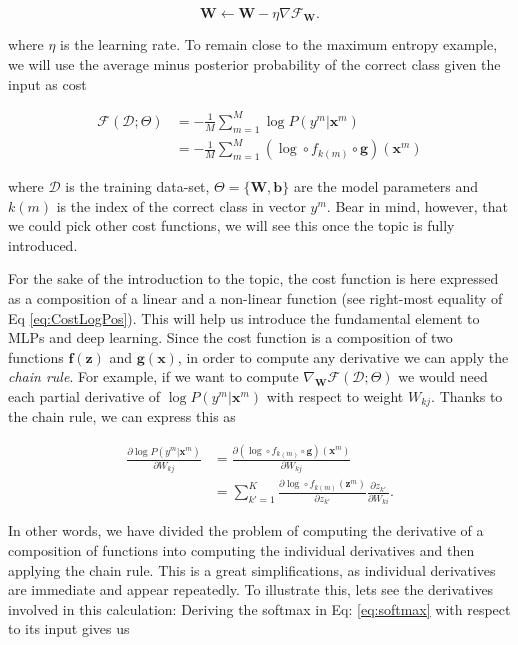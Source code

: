 \begin{equation}
\mathbf{W} \leftarrow \mathbf{W} - \eta \nabla\mathcal{F}_\mathbf{W}. 
\end{equation}

where $\eta$ is the learning rate. To remain close to the maximum entropy
example, we will use the average minus posterior probability of the correct
class given the input as cost

\begin{align}
\mathcal{F}(\mathcal{D};\Theta) & = -\frac{1}{M}\sum_{m=1}^M \log P(y^m | \mathbf{x}^m) \nonumber\\&= -\frac{1}{M}\sum_{m=1}^M (\log \circ f_{k(m)} \circ \mathbf{g})(\mathbf{x}^m)
\label{eq:CostLogPos}
\end{align}
	
where $\mathcal{D}$ is the training data-set, $\Theta=\{\mathbf{W},
\mathbf{b}\}$ are the model parameters and $k(m)$ is the index of the correct
class in vector $y^m$. 
Bear in mind, however, that we could pick other cost functions, we will see this once the topic is fully introduced.

For the sake of the introduction to the topic, the cost function is here
expressed as a composition of a linear and a non-linear function (see
right-most equality of Eq \ref{eq:CostLogPos}). This will help us introduce the
fundamental element to MLPs and deep learning. Since the cost function is a
composition of two functions  $\mathbf{f}(\mathbf{z})$ and
$\mathbf{g}(\mathbf{x})$, in order to compute any derivative we can apply the
\textit{chain rule}. For example, if we want to compute
$\nabla_\mathbf{W}\mathcal{F}(\mathcal{D};\Theta)$ we would need each partial
derivative of $\log P(y^m | \mathbf{x}^m)$ with respect to weight $W_{kj}$.
Thanks to the chain rule, we can express this as

\begin{align}
\frac{\partial \log P(y^m | \mathbf{x}^m) }{\partial W_{kj}} & = \frac{\partial (\log \circ f_{k(m)} \circ \mathbf{g})(\mathbf{x}^m) }{\partial W_{kj}} \nonumber\\& = \sum_{k'=1}^K\frac{\partial \log \circ f_{k(m)}(\mathbf{z}^m)}{\partial z_{k'}}\frac{\partial z_{k'}}{\partial W_{ki}}.
\label{eq:gradlogPycx}
\end{align}

In other words, we have divided the problem of computing the derivative of a
composition of functions into computing the individual derivatives and then
applying the chain rule. This is a great simplifications, as individual
derivatives are immediate and appear repeatedly. To illustrate this, lets see
the derivatives involved in this calculation: Deriving the softmax in Eq:
\ref{eq:softmax} with respect to its input gives us 

